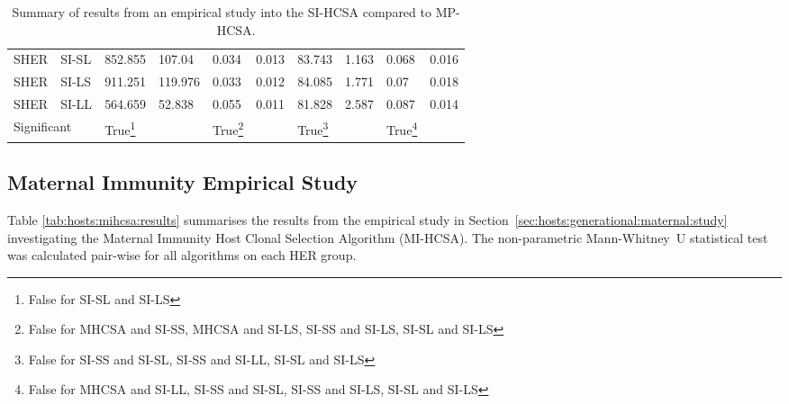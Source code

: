 \begin{table}[H]
\begin{minipage}{\textwidth}
\begin{tabular}{llllllllll}
		SHER & SI-SL & 852.855 & 107.04 & 0.034 & 0.013 & 83.743 & 1.163 & 0.068 & 0.016 \\ 
		SHER & SI-LS & 911.251 & 119.976 & 0.033 & 0.012 & 84.085 & 1.771 & 0.07 & 0.018 \\ 
		SHER & SI-LL & 564.659 & 52.838 & 0.055 & 0.011 & 81.828 & 2.587 & 0.087 & 0.014 \\ 
		\multicolumn{2}{l}{Significant} & True\footnote{False for SI-SL and SI-LS} & & True\footnote{False for MHCSA and SI-SS, MHCSA and SI-LS, SI-SS and SI-LS, SI-SL and SI-LS} & & True\footnote{False for SI-SS and SI-SL, SI-SS and SI-LL, SI-SL and SI-LS} & & True\footnote{False for MHCSA and SI-LL, SI-SS and SI-SL, SI-SS and SI-LS, SI-SL and SI-LS} & \\ 
		\bottomrule
		\end{tabular}	
		\end{minipage}		
	\caption{Summary of results from an empirical study into the SI-HCSA compared to MP-HCSA.}
	\label{tab:hosts:sihcsa:results}
\end{table}


%
%
\subsection{Maternal Immunity Empirical Study}
\label{appendix:results:hosts:maternal}
Table \ref{tab:hosts:mihcsa:results} summarises the results from the empirical study in Section~\ref{sec:hosts:generational:maternal:study} investigating the Maternal Immunity Host Clonal Selection Algorithm (MI-HCSA). The non-parametric Mann-Whitney~U statistical test was calculated pair-wise for all algorithms on each HER group.

